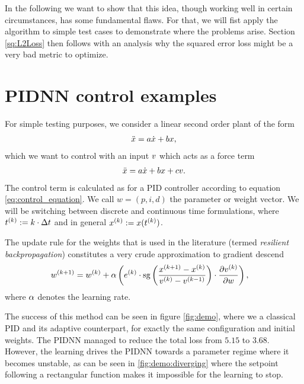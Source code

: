 \documentclass{article}
\begin{document}
    In the following we want to show that this idea, though working well in certain circumstances, 
    has some fundamental flaws. For that, we will fist apply the algorithm to simple test cases to 
    demonstrate where the problems arise. Section \ref{sq:L2Loss} then follows with an analysis why 
    the squared error loss might be a very bad metric to optimize. 






  \section{PIDNN control examples}
    For simple testing purposes, we  consider a linear second order plant of the form
    \begin{align}
        \ddot{x} = a \dot{x} + b x,
    \end{align}
    which we want to control with an input $v$ which acts as a force term
    \begin{align}
        \ddot{x} = a \dot{x} + b x + c v. \label{eq:qe_of_motion_system}
    \end{align}
    The control term is calculated as for a PID controller according to equation \eqref{eq:control_equation}. 
    We call $w = (p, i, d)$ the parameter or weight vector. 
    We will be switching between discrete and continuous time formulations, 
    where ${t}^{(k)} := k \cdot \Delta t$ and in general ${x}^{(k)} := x({t}^{(k)})$.


    The update rule for the weights that is used in the literature \cite{cong_novel_2005} 
    (termed \emph{resilient backpropagation}) constitutes a very crude approximation to gradient descend
    \begin{align}
        {w}^{(k+1)} &= {w}^{(k)} + \alpha \left( {e}^{(k)} \cdot 
                        \operatorname{sg} \left(\frac{{x}^{(k+1)} - {x}^{(k)}}{{v}^{(k)} 
                        - {v}^{(k-1)}}\right) \cdot 
                        \frac{\partial {v}^{(k)}}{\partial w}\right), \label{eq:diffq_pidnn}
    \end{align}
    where $\alpha$ denotes the learning rate. 

    The success of this method can be seen in figure \ref{fig:demo}, where we a classical PID 
    and its adaptive counterpart, for exactly the same configuration and initial weights. 
    The PIDNN managed to reduce the total loss from $5.15$ to $3.68$. However, the learning drives the PIDNN towards a 
    parameter regime where it becomes unstable, as can be seen in \ref{fig:demo:diverging} where the setpoint following 
    a rectangular function makes it impossible for the learning to stop. 
\end{document}

